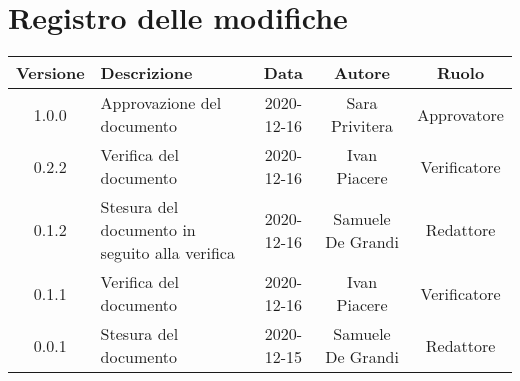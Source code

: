 \section*{Registro delle modifiche}

\begin{center}
	\begin{longtable}{|c|p{5cm}|c|c|c|}
	\hline
	\rowcolor{lighter-grayer}
	\textbf{Versione} & \textbf{Descrizione} & \textbf{Data} & \textbf{Autore} & \textbf{Ruolo} \\
	\hline
	\endfirsthead


	\hline
	1.0.0 & Approvazione del documento & 2020-12-16 & Sara Privitera & Approvatore \\
	\hline
	0.2.2 & Verifica del documento & 2020-12-16 & Ivan Piacere & Verificatore \\
	\hline
	0.1.2 & Stesura del documento in seguito alla verifica & 2020-12-16 & Samuele De Grandi & Redattore \\
	\hline
	0.1.1 & Verifica del documento & 2020-12-16 & Ivan Piacere & Verificatore \\
	\hline
	0.0.1 & Stesura del documento & 2020-12-15 & Samuele De Grandi & Redattore \\
	\hline
    
	\end{longtable}
\end{center}
